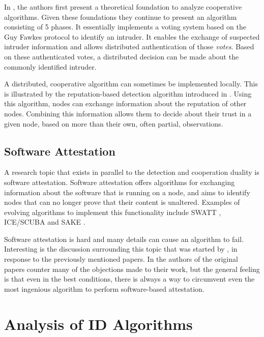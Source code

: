 \documentclass[conference]{IEEEtran}
\begin{document}
In \cite{krontiris2009cooperative}, the authors first present a theoretical
foundation to analyze cooperative algorithms. Given these foundations they
continue to present an algorithm consisting of 5 phases. It essentially
implements a voting system based on the Guy Fawkes protocol
\cite{anderson1998new} to identify an intruder. It enables the exchange of
suspected intruder information and allows distributed authentication of those
\emph{votes}. Based on these authenticated votes, a distributed decision can be
made about the commonly identified intruder.

A distributed, cooperative algorithm can sometimes be implemented locally. This
is illustrated by the reputation-based detection algorithm introduced in
\cite{ganeriwal2008reputation}. Using this algorithm, nodes can exchange
information about the reputation of other nodes. Combining this information
allows them to decide about their trust in a given node, based on more than
their own, often partial, observations.

\subsection{Software Attestation}
\label{subsection:attestation}

A research topic that exists in parallel to the detection and cooperation
duality is software attestation. Software attestation offers algorithms for
exchanging information about the software that is running on a node, and aims
to identify nodes that can no longer prove that their content is unaltered.
Examples of evolving algorithms to implement this functionality include SWATT
\cite{seshadri2004swatt}, ICE/SCUBA \cite{seshadri2006scuba} and SAKE
\cite{seshadri2008sake}.

Software attestation is hard and many details can cause an algorithm to fail.
Interesting is the discussion surrounding this topic that was started by
\cite{castelluccia2009difficulty}, in response to the previously mentioned
papers. In \cite{perrig2010refutation} the authors of the original papers
counter many of the objections made to their work, but the general feeling is
that even in the best conditions, there is always a way to circumvent even the
most ingenious algorithm to perform software-based attestation.

\section{Analysis of ID Algorithms}
\label{analysis}
\end{document}
